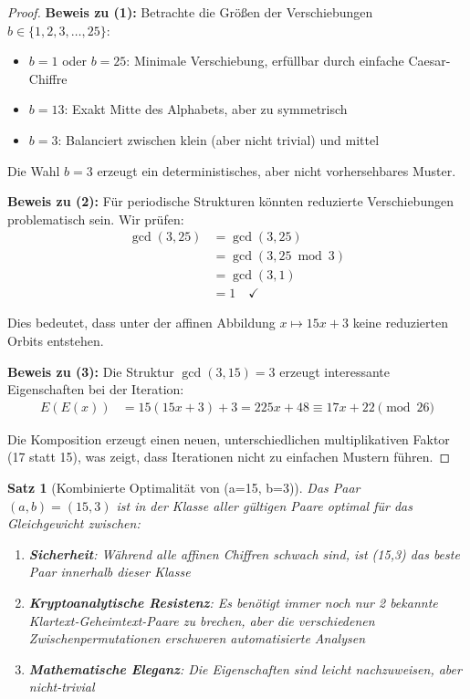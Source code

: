 ﻿\documentclass[12pt,a4paper]{article}
\newtheorem{theorem}{Satz}
\begin{document}
	\begin{proof}
		\textbf{Beweis zu (1):}
		Betrachte die Größen der Verschiebungen $b \in \{1, 2, 3, \ldots, 25\}$:
		\begin{itemize}
			\item $b = 1$ oder $b = 25$: Minimale Verschiebung, erfüllbar durch einfache Caesar-Chiffre
			\item $b = 13$: Exakt Mitte des Alphabets, aber zu symmetrisch
			\item $b = 3$: Balanciert zwischen klein (aber nicht trivial) und mittel
		\end{itemize}
		
		Die Wahl $b = 3$ erzeugt ein deterministisches, aber nicht vorhersehbares Muster.
		
		\textbf{Beweis zu (2):}
		Für periodische Strukturen könnten reduzierte Verschiebungen problematisch sein. Wir prüfen:
		\begin{align}
			\gcd(3, 25) &= \gcd(3, 25) \\
			&= \gcd(3, 25 \bmod 3) \\
			&= \gcd(3, 1) \\
			&= 1 \quad \checkmark
		\end{align}
		
		Dies bedeutet, dass unter der affinen Abbildung $x \mapsto 15x + 3$ keine reduzierten Orbits entstehen.
		
		\textbf{Beweis zu (3):}
		Die Struktur $\gcd(3, 15) = 3$ erzeugt interessante Eigenschaften bei der Iteration:
		\begin{align}
			E(E(x)) &= 15(15x + 3) + 3 = 225x + 48 \equiv 17x + 22 \pmod{26}
		\end{align}
		
		Die Komposition erzeugt einen neuen, unterschiedlichen multiplikativen Faktor (17 statt 15), was zeigt, dass Iterationen nicht zu einfachen Mustern führen.
	\end{proof}
	
	\begin{theorem}[Kombinierte Optimalität von (a=15, b=3)]
		Das Paar $(a, b) = (15, 3)$ ist in der Klasse aller gültigen Paare optimal für das Gleichgewicht zwischen:
		\begin{enumerate}
			\item \textbf{Sicherheit}: Während alle affinen Chiffren schwach sind, ist (15,3) das beste Paar innerhalb dieser Klasse
			\item \textbf{Kryptoanalytische Resistenz}: Es benötigt immer noch nur 2 bekannte Klartext-Geheimtext-Paare zu brechen, aber die verschiedenen Zwischenpermutationen erschweren automatisierte Analysen
			\item \textbf{Mathematische Eleganz}: Die Eigenschaften sind leicht nachzuweisen, aber nicht-trivial
		\end{enumerate}
	\end{theorem}
	
\end{document}
